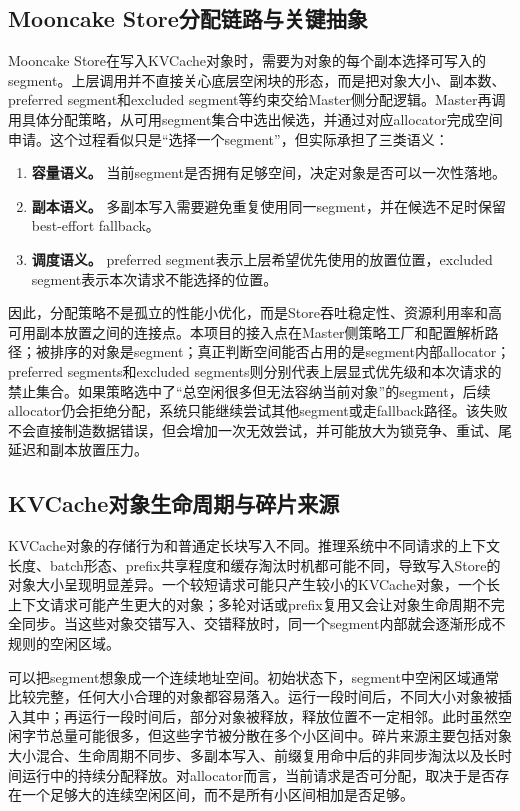 \documentclass[UTF8,zihao=-4,a4paper]{ctexart}
\begin{document}
\subsection{Mooncake Store分配链路与关键抽象}

Mooncake Store在写入KVCache对象时，需要为对象的每个副本选择可写入的segment。上层调用并不直接关心底层空闲块的形态，而是把对象大小、副本数、preferred segment和excluded segment等约束交给Master侧分配逻辑。Master再调用具体分配策略，从可用segment集合中选出候选，并通过对应allocator完成空间申请。这个过程看似只是“选择一个segment”，但实际承担了三类语义：

\begin{enumerate}
  \item \textbf{容量语义。} 当前segment是否拥有足够空间，决定对象是否可以一次性落地。
  \item \textbf{副本语义。} 多副本写入需要避免重复使用同一segment，并在候选不足时保留best-effort fallback。
  \item \textbf{调度语义。} preferred segment表示上层希望优先使用的放置位置，excluded segment表示本次请求不能选择的位置。
\end{enumerate}

因此，分配策略不是孤立的性能小优化，而是Store吞吐稳定性、资源利用率和高可用副本放置之间的连接点。本项目的接入点在Master侧策略工厂和配置解析路径；被排序的对象是segment；真正判断空间能否占用的是segment内部allocator；preferred segments和excluded segments则分别代表上层显式优先级和本次请求的禁止集合。如果策略选中了“总空闲很多但无法容纳当前对象”的segment，后续allocator仍会拒绝分配，系统只能继续尝试其他segment或走fallback路径。该失败不会直接制造数据错误，但会增加一次无效尝试，并可能放大为锁竞争、重试、尾延迟和副本放置压力。

\subsection{KVCache对象生命周期与碎片来源}

KVCache对象的存储行为和普通定长块写入不同。推理系统中不同请求的上下文长度、batch形态、prefix共享程度和缓存淘汰时机都可能不同，导致写入Store的对象大小呈现明显差异。一个较短请求可能只产生较小的KVCache对象，一个长上下文请求可能产生更大的对象；多轮对话或prefix复用又会让对象生命周期不完全同步。当这些对象交错写入、交错释放时，同一个segment内部就会逐渐形成不规则的空闲区域。

可以把segment想象成一个连续地址空间。初始状态下，segment中空闲区域通常比较完整，任何大小合理的对象都容易落入。运行一段时间后，不同大小对象被插入其中；再运行一段时间后，部分对象被释放，释放位置不一定相邻。此时虽然空闲字节总量可能很多，但这些字节被分散在多个小区间中。碎片来源主要包括对象大小混合、生命周期不同步、多副本写入、前缀复用命中后的非同步淘汰以及长时间运行中的持续分配释放。对allocator而言，当前请求是否可分配，取决于是否存在一个足够大的连续空闲区间，而不是所有小区间相加是否足够。
\end{document}
